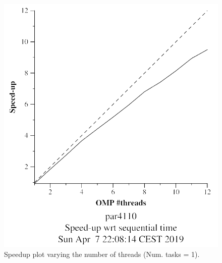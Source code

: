 \documentclass[12pt, a4paper]{article}
\begin{document}
\begin{figure}[H]
\hspace{0.5cm}
\begin{minipage}[b]{0.4\linewidth}
  \centering
  \includegraphics[scale=0.5]{./mandel-omp-10000-strong-omp-24-1-speedup}
  \caption{Speedup plot varying the number of threads (Num. tasks = 1).}
  \label{fig:mandel-omp-10000-strong-omp-24-1-speedup}
\end{minipage}
\end{figure}
\end{document}
